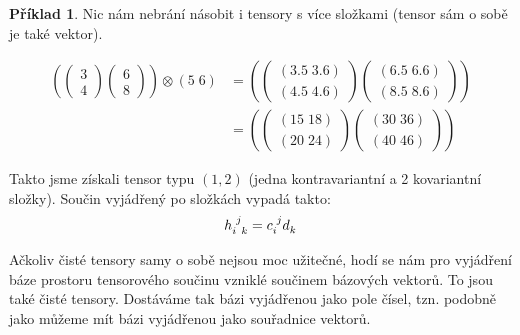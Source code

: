 \documentclass[a5paper,12pt]{amsbook}
\theoremstyle{definition}
\newtheorem{example}{Příklad}[chapter]
\begin{document}
\begin{example}
Nic nám nebrání násobit i tensory s více složkami (tensor sám o sobě je také vektor).

\begin{equation*}
\begin{split}
\left(
\left(\begin{array}{c}
3 \\ 4
\end{array}\right)
\left(\begin{array}{c}
6 \\ 8
\end{array}\right)
\right)\otimes\left(5\;6\right)
&=\left(
\left(\begin{array}{c}
\left(3.5 \; 3.6\right) \\ \left(4.5 \; 4.6\right)
\end{array}\right)
\left(\begin{array}{c}
\left(6.5 \; 6.6\right) \\ \left(8.5 \; 8.6\right)
\end{array}\right)
\right) \\
&=\left(
\left(\begin{array}{c}
\left(15 \; 18\right) \\ \left(20 \; 24\right)
\end{array}\right)
\left(\begin{array}{c}
\left(30 \; 36\right) \\ \left(40 \; 46\right)
\end{array}\right)
\right)
\end{split}
\end{equation*}

Takto jsme získali tensor typu $(1, 2)$ (jedna kontravariantní a 2 kovariantní
složky). Součin vyjádřený po složkách vypadá takto:
\begin{equation*}
\begin{split}
h\indices{_i^j_k} = c\indices{_i^j} d\indices{_k}
\end{split}
\end{equation*}

\end{example}

Ačkoliv čisté tensory samy o sobě nejsou moc užitečné, hodí se nám pro vyjádření
báze prostoru tensorového součinu vzniklé součinem bázových vektorů. To jsou také
čisté tensory. Dostáváme tak bázi vyjádřenou jako pole čísel, tzn. podobně jako
můžeme mít bázi vyjádřenou jako souřadnice vektorů.
\end{document}
